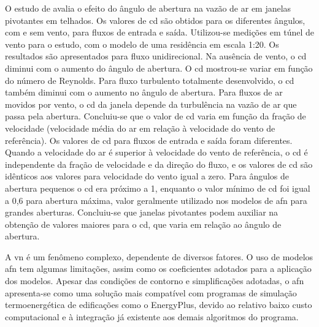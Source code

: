 \documentclass[brazil,hardcopy,openany]{ufscthesis} %
\begin{document}
O estudo de  avalia o efeito do ângulo de abertura na vazão de ar em janelas pivotantes em telhados. Os valores de \acrshort{cd} são obtidos para os diferentes ângulos, com e sem vento, para fluxos de entrada e saída. Utilizou-se medições em túnel de vento para o estudo, com o modelo de uma residência em escala 1:20. Os resultados são apresentados para fluxo unidirecional. Na ausência de vento, o \acrshort{cd} diminui com o aumento do ângulo de abertura. O \acrshort{cd} mostrou-se variar em função do número de Reynolds. Para fluxo turbulento totalmente desenvolvido, o \acrshort{cd} também diminui com o aumento no ângulo de abertura. Para fluxos de ar movidos por vento, o \acrshort{cd} da janela depende da turbulência na vazão de ar que passa pela abertura. Concluiu-se que o valor de \acrshort{cd} varia em função da fração de velocidade (velocidade média do ar em relação à velocidade do vento de referência). Os valores de \acrshort{cd} para fluxos de entrada e saída foram diferentes. Quando a velocidade do ar é superior à velocidade do vento de referência, o \acrshort{cd} é independente da fração de velocidade e da direção do fluxo, e os valores de \acrshort{cd} são idênticos aos valores para velocidade do vento igual a zero. Para ângulos de abertura pequenos o \acrshort{cd} era próximo a 1, enquanto o valor mínimo de \acrshort{cd} foi igual a 0,6 para abertura máxima, valor geralmente utilizado nos modelos de \acrshort{afn} para grandes aberturas. Concluiu-se que janelas pivotantes podem auxiliar na obtenção de valores maiores para o \acrshort{cd}, que varia em relação ao ângulo de abertura.
%

A \acrlong{vn} é um fenômeno complexo, dependente de diversos fatores. O uso de modelos \acrshort{afn} tem algumas limitações, assim como os coeficientes adotados para a aplicação dos modelos. Apesar das condições de contorno e simplificações adotadas, o \acrshort{afn} apresenta-se como uma solução mais compatível com programas de simulação termoenergética de edificações como o EnergyPlus, devido ao relativo baixo custo computacional e à integração já	existente aos demais algoritmos do programa.
\end{document}
